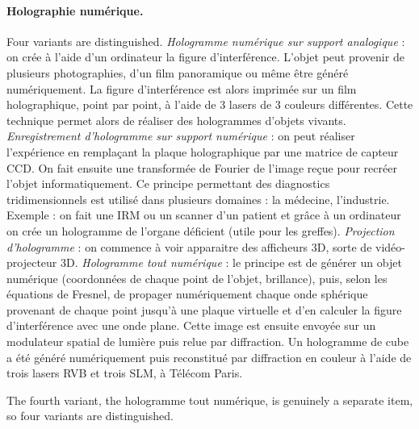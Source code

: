 \paragraph{Holographie numérique.}
Four variants are distinguished. \emph{Hologramme numérique sur support
analogique} : on crée à l'aide d'un ordinateur la figure d'interférence. L'objet
peut provenir de plusieurs photographies, d'un film panoramique ou même être
généré numériquement. La figure d'interférence est alors imprimée sur un film
holographique, point par point, à l'aide de 3 lasers de 3 couleurs différentes.
Cette technique permet alors de réaliser des hologrammes d'objets vivants.
\emph{Enregistrement d'hologramme sur support numérique} : on peut réaliser
l'expérience en remplaçant la plaque holographique par une matrice de capteur
CCD. On fait ensuite une transformée de Fourier de l'image reçue pour recréer
l'objet informatiquement. Ce principe permettant des diagnostics
tridimensionnels est utilisé dans plusieurs domaines : la médecine, l'industrie.
Exemple : on fait une IRM ou un scanner d'un patient et grâce à un ordinateur on
crée un hologramme de l'organe déficient (utile pour les greffes).
\emph{Projection d'hologramme} : on commence à voir apparaitre des afficheurs
3D, sorte de vidéo-projecteur 3D. \emph{Hologramme tout numérique} : le principe
est de générer un objet numérique (coordonnées de chaque point de l'objet,
brillance), puis, selon les équations de Fresnel, de propager numériquement
chaque onde sphérique provenant de chaque point jusqu'à une plaque virtuelle et
d'en calculer la figure d'interférence avec une onde plane. Cette image est
ensuite envoyée sur un modulateur spatial de lumière puis relue par diffraction.
Un hologramme de cube a été généré numériquement puis reconstitué par
diffraction en couleur à l'aide de trois lasers RVB et trois SLM, à Télécom
Paris.

\begin{remark}
  The fourth variant, the hologramme tout numérique, is genuinely a separate item,
  so four variants are distinguished.
\end{remark}


